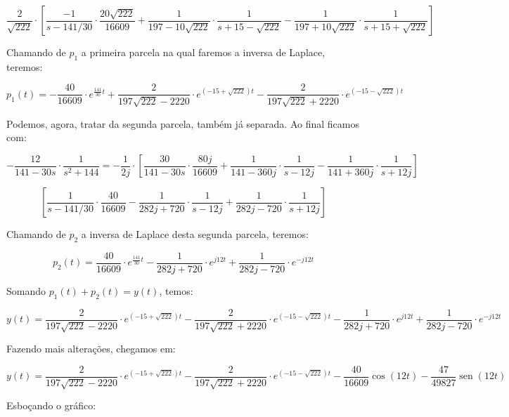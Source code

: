 \documentclass{article}
\DeclareMathOperator{\sen}{sen}
\begin{document}
\[\frac{2}{\sqrt{222}} \cdot \left[ 
    \frac{-1}{s - 141/30} \cdot \frac{20\sqrt{222}}{16609} +
    \frac{1}{197 - 10\sqrt{222}} \cdot \frac{1}{s + 15 - \sqrt{222}} -
    \frac{1}{197 + 10\sqrt{222}} \cdot \frac{1}{s + 15 + \sqrt{222}}
\right]\]

Chamando de $p_1$ a primeira parcela na qual faremos a inversa de Laplace, teremos:

\[p_1(t) = 
    -\frac{40}{16609} \cdot e^{\frac{141}{30}t} +
    \frac{2}{197\sqrt{222} - 2220} \cdot e^{(-15 + \sqrt{222})t} - 
    \frac{2}{197\sqrt{222} + 2220} \cdot e^{(-15 - \sqrt{222})t}
\]

Podemos, agora, tratar da segunda parcela, também já separada. Ao final ficamos com:

\[- \frac{12}{141 - 30s} \cdot \frac{1}{s^2 + 144} = 
    -\frac{1}{2j} \cdot \left[
        \frac{30}{141 - 30s} \cdot \frac{80j}{16609} +
        \frac{1}{141 - 360j} \cdot \frac{1}{s - 12j} -
        \frac{1}{141 + 360j} \cdot \frac{1}{s + 12j}
    \right]
\]

\[ \left[
        \frac{1}{s - 141/30} \cdot \frac{40}{16609} -
        \frac{1}{282j + 720} \cdot \frac{1}{s - 12j} +
        \frac{1}{282j - 720} \cdot \frac{1}{s + 12j}
    \right]
\]

Chamando de $p_2$ a inversa de Laplace desta segunda parcela, teremos:

\[ p_2(t) = 
    \frac{40}{16609} \cdot e^{\frac{141}{30}t} -
    \frac{1}{282j + 720} \cdot e^{j12t} +
    \frac{1}{282j - 720} \cdot e^{-j12t}
\]

Somando $p_1(t) + p_2(t) = y(t)$, temos:

\[y(t) = 
\frac{2}{197\sqrt{222} - 2220} \cdot e^{(-15 + \sqrt{222})t} -
\frac{2}{197\sqrt{222} + 2220} \cdot e^{(-15 - \sqrt{222})t} -
\frac{1}{282j + 720} \cdot e^{j12t} +
\frac{1}{282j - 720} \cdot e^{-j12t}
\]

Fazendo mais alterações, chegamos em:

\[y(t) = 
\frac{2}{197\sqrt{222} - 2220} \cdot e^{(-15 + \sqrt{222})t} -
\frac{2}{197\sqrt{222} + 2220} \cdot e^{(-15 - \sqrt{222})t} -
\frac{40}{16609}\cos(12t) - \frac{47}{49827}\sen(12t)
\]

Esboçando o gráfico:
\end{document}
